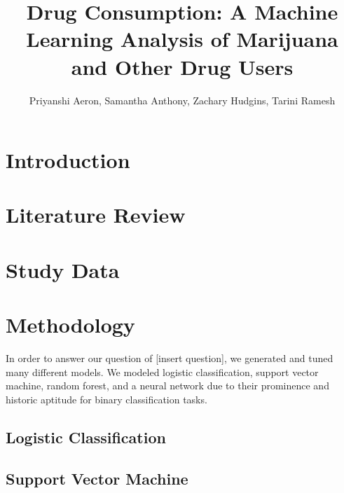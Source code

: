 \documentclass{article}
\title{Drug Consumption: A Machine Learning Analysis of Marijuana 
and Other Drug Users}
\author{Priyanshi Aeron, Samantha Anthony, Zachary Hudgins, Tarini Ramesh}
\date{}
\begin{document}
\maketitle

\section{Introduction}

\section{Literature Review}

\section{Study Data}

\section{Methodology}
In order to answer our question of [insert question], we generated and tuned many different models. We modeled logistic classification, support vector machine, random forest, and a neural network due to their prominence and historic aptitude for binary classification tasks.
\subsection{Logistic Classification}
\subsection{Support Vector Machine}
\end{document}
